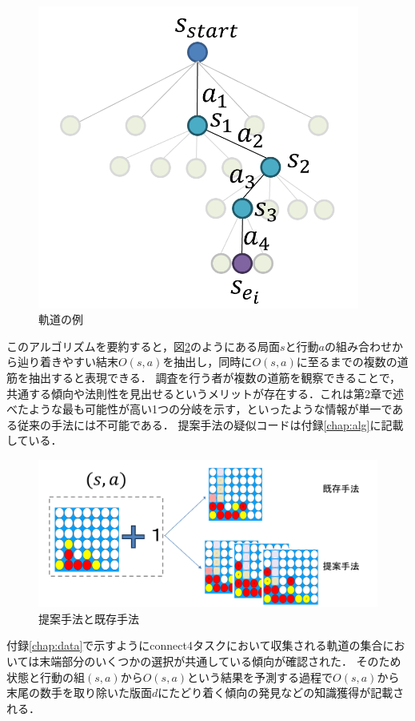 \begin{figure}[t]
    \centering
    \includegraphics[width=300pt]{./figure/traj-example.png}
    \caption{軌道の例}
    \label{fig:step3-4}
\end{figure}
このアルゴリズムを要約すると，図\ref{fig:merit}のようにある局面$s$と行動$a$の組み合わせから辿り着きやすい結末$O(s, a)$を抽出し，同時に$O(s, a)$に至るまでの複数の道筋を抽出すると表現できる．
調査を行う者が複数の道筋を観察できることで，
共通する傾向や法則性を見出せるというメリットが存在する．これは第2章で述べたような最も可能性が高い1つの分岐を示す，といったような情報が単一である従来の手法には不可能である．
提案手法の疑似コードは付録\ref{chap:alg}に記載している．

\begin{figure}[t]
    \includegraphics[width=400pt]{./figure/merit.png}
	\caption{提案手法と既存手法}
	\label{fig:merit}
\end{figure}




付録\ref{chap:data}で示すようにconnect4タスクにおいて収集される軌道の集合においては末端部分のいくつかの選択が共通している傾向が確認された．
そのため状態と行動の組$(s, a)$から$O(s, a)$という結果を予測する過程で$O(s, a)$から末尾の数手を取り除いた版面$d$にたどり着く傾向の発見などの知識獲得が記載される．
